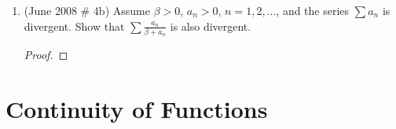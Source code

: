 \documentclass[reqno]{article}
\theoremstyle{remark}
\numberwithin{equation}{section}
\begin{document}
\begin{enumerate}
	\begin{proof}
	
	\end{proof}
	 
	\item (June 2008 \# 4b) Assume $\beta >0$, $a_n>0$, $n=1,2,\ldots$, and the series $\sum a_n$ is divergent.  Show that $\displaystyle \sum \frac{a_n}{\beta + a_n}$ is also divergent.
	
	\begin{proof}
	
	\end{proof} 
	
	
\end{enumerate}
\section{Continuity of Functions}
\end{document}
